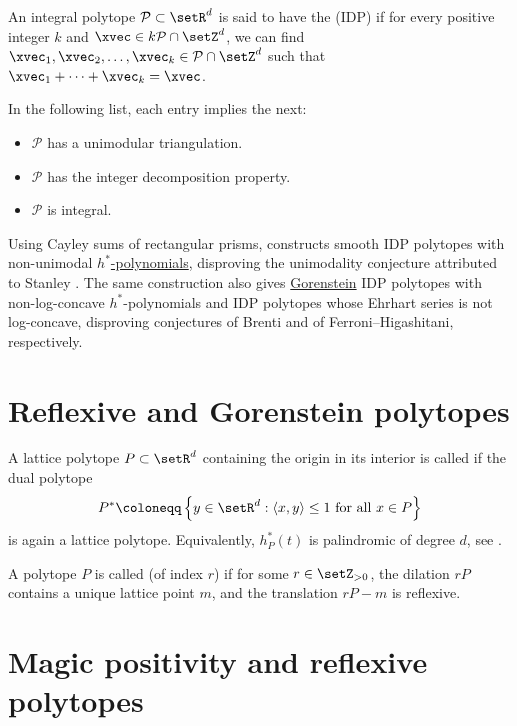 An integral polytope $\mathcal{P} \subset \setR^d$ is said to have the
\label{integerDecompositionProperty} (IDP)
if for every positive integer $k$ and $\xvec \in k \mathcal{P} \cap \setZ^d$,
we can find $\xvec_1,\xvec_2,\dotsc,\xvec_k \in \mathcal{P} \cap \setZ^d$
such that $\xvec_1 + \dotsb + \xvec_k = \xvec$.

In the following list, each entry implies the next:
\begin{itemize}
	\item $\mathcal{P}$ has a unimodular triangulation.
	\item $\mathcal{P}$ has the integer decomposition property.
	\item $\mathcal{P}$ is integral.
\end{itemize}

Using Cayley sums of rectangular prisms,  constructs
smooth IDP polytopes with non-unimodal
\hyperref[hStarPolynomial]{$h^*$-polynomials}, disproving the unimodality
conjecture attributed to Stanley \cite{Ferroni2026Unimodality}.
The same construction also gives \hyperref[gorenstein]{Gorenstein} IDP
polytopes with non-log-concave $h^*$-polynomials and IDP polytopes whose
Ehrhart series is not log-concave, disproving conjectures of Brenti and of
Ferroni--Higashitani, respectively.





\section[gorenstein]{Reflexive and Gorenstein polytopes}\label{reflexivePolytope}

A lattice polytope $P \subset \setR^d$ containing the origin in its interior
is called \label{reflexivePolytopeDefinition}
if the dual polytope
\[
 P^* \coloneqq \left\{ y \in \setR^d : \langle x, y \rangle \leq 1 \text{ for all } x \in P \right\}
\]
is again a lattice polytope.
Equivalently, $h^*_P(t)$ is palindromic of degree $d$, see \cite{Hibi92}.

A polytope $P$ is called \label{gorensteinPolytope}
(of index $r$) if for some $r\in\setZ_{>0}$, the dilation $rP$ contains a
unique lattice point $m$, and the translation $rP-m$ is reflexive.



\section[magicPositiveEhrhart]{Magic positivity and reflexive polytopes}

